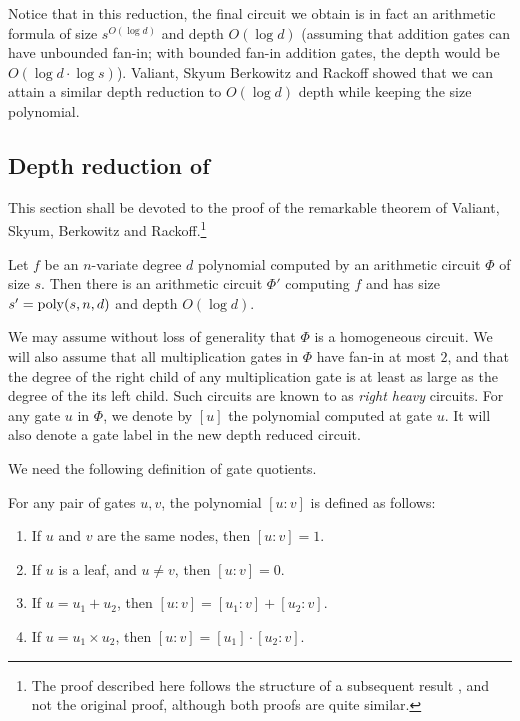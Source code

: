 Notice that in this reduction, the final circuit we obtain is in fact an arithmetic formula of size $s^{O(\log d)}$ and depth $O(\log d)$ (assuming that addition gates can have unbounded fan-in; with bounded fan-in addition gates, the depth would be $O(\log d \cdot \log s)$). 
Valiant, Skyum Berkowitz and Rackoff \cite{vsbr83} showed that we can attain a similar depth reduction to $O(\log d)$ depth while keeping the size polynomial. 


\subsection{Depth reduction of \cite{vsbr83}}


This section shall be devoted to the proof of the remarkable theorem of Valiant, Skyum, Berkowitz and Rackoff.\footnote{The proof described here follows the structure of a subsequent result \cite{ajmv98}, and not the original proof, although both proofs are quite similar.}


\begin{theorem}\label{thm:vsbr}
  Let $f$ be an $n$-variate degree $d$ polynomial computed by an
  arithmetic circuit $\Phi$ of size $s$. 
Then there is an arithmetic
  circuit $\Phi'$ computing $f$ and has size $s' = \operatorname{poly}(s,n,d)$ and
  depth $O(\log d)$.
\end{theorem}

We may assume without loss of generality that $\Phi$ is a homogeneous
circuit. 
We will also assume that all multiplication gates in $\Phi$
have fan-in at most $2$, and that the degree of the right child of any
multiplication gate is at least as large as the degree of the its left
child. 
Such circuits are known to as \emph{right heavy} circuits. 
For any gate $u$ in $\Phi$, we denote by $[u]$ the polynomial computed at
gate $u$. 
It will also denote a gate label in the new depth reduced
circuit.

We need the following definition of gate quotients.

\begin{definition}\label{defn:gate-quotient}
For any pair of gates $u,v$, the polynomial $[u:v]$ is defined as follows:
\begin{enumerate}
\item If $u$ and $v$ are the same nodes, then $[u:v] = 1$. 
\item If $u$ is a leaf, and $u\neq v$, then $[u:v] = 0$. 
\item If $u = u_1 + u_2$, then $[u:v] = [u_1:v] + [u_2:v]$.
\item If $u = u_1 \times u_2$, then $[u:v] = [u_1] \cdot [u_2 : v]$. \qedhere
\end{enumerate}
\end{definition}

